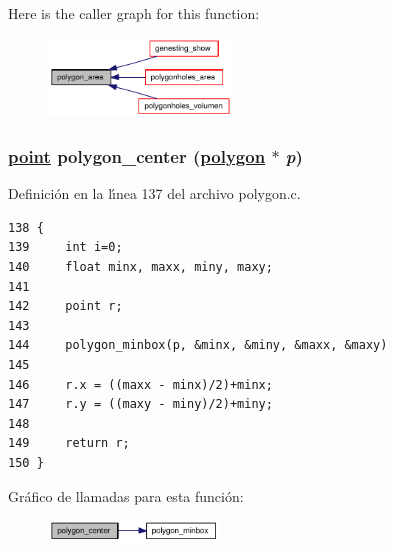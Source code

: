 Here is the caller graph for this function:\begin{figure}[H]
\begin{center}
\leavevmode
\includegraphics[width=138pt]{group__geometry_gcfbc9e7772d80361768bc0b65cebbca1_gcfbc9e7772d80361768bc0b65cebbca1_icgraph}
\end{center}
\end{figure}
\hypertarget{group__geometry_ge39fef354e4411678ec081c197b29825_ge39fef354e4411678ec081c197b29825}{
\subsubsection[polygon\_\-center]{\setlength{\rightskip}{0pt plus 5cm}\hyperlink{struct__point}{point} polygon\_\-center (\hyperlink{struct__polygon}{polygon} $\ast$ {\em p})}}
\label{group__geometry_ge39fef354e4411678ec081c197b29825_ge39fef354e4411678ec081c197b29825}




Definici\'{o}n en la l\'{\i}nea 137 del archivo polygon.c.

\begin{Code}\begin{verbatim}138 {
139     int i=0;
140     float minx, maxx, miny, maxy;
141 
142     point r;
143 
144     polygon_minbox(p, &minx, &miny, &maxx, &maxy)
145 
146     r.x = ((maxx - minx)/2)+minx;
147     r.y = ((maxy - miny)/2)+miny;
148 
149     return r;
150 }
\end{verbatim}\end{Code}




Gr\'{a}fico de llamadas para esta funci\'{o}n:\begin{figure}[H]
\begin{center}
\leavevmode
\includegraphics[width=128pt]{group__geometry_ge39fef354e4411678ec081c197b29825_ge39fef354e4411678ec081c197b29825_cgraph}
\end{center}
\end{figure}


